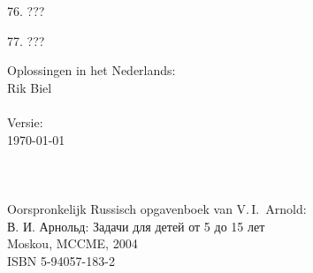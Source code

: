 \begin{problem}{76.}
	???
\end{problem}

\begin{problem}{77.}
	???
\end{problem}

\clearpage

\null\vfill
\noindent
Oplossingen in het Nederlands:\\
\null\quad Rik Biel\\
\\
Versie:\\
\null\quad \today\\
\\
\\
\\
Oorspronkelijk Russisch opgavenboek van V.\,I.~Arnold:\\
\null\quad \textrussian{В. И. Арнольд: Задачи для детей от 5 до 15 лет}\\
\null\quad Moskou, MCCME, 2004\\
\null\quad ISBN 5-94057-183-2


